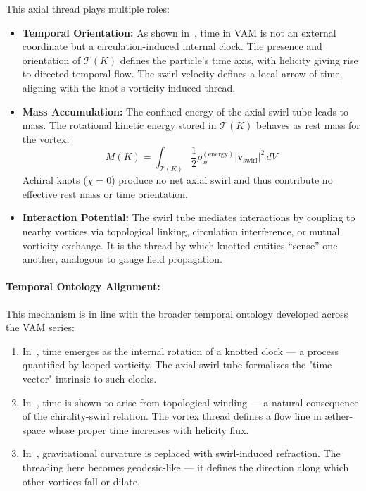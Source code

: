 \documentclass[a4paper,12pt]{article}
\begin{document}
This axial thread plays multiple roles:
\begin{itemize}
    \item \textbf{Temporal Orientation:} As shown in~\cite{VAM2}, time in VAM is not an external coordinate but a circulation-induced internal clock. The presence and orientation of $\mathcal{T}(K)$ defines the particle’s time axis, with helicity giving rise to directed temporal flow. The swirl velocity defines a local arrow of time, aligning with the knot’s vorticity-induced thread.

    \item \textbf{Mass Accumulation:} The confined energy of the axial swirl tube leads to mass. The rotational kinetic energy stored in $\mathcal{T}(K)$ behaves as rest mass for the vortex:
    \begin{equation}
        M(K) = \int_{\mathcal{T}(K)} \frac{1}{2} \rho_{\text{\ae}}^{(\text{energy})} |\mathbf{v}_{\text{swirl}}|^2 \, dV
    \end{equation}
    Achiral knots ($\chi = 0$) produce no net axial swirl and thus contribute no effective rest mass or time orientation.

    \item \textbf{Interaction Potential:} The swirl tube mediates interactions by coupling to nearby vortices via topological linking, circulation interference, or mutual vorticity exchange. It is the thread by which knotted entities “sense” one another, analogous to gauge field propagation.
\end{itemize}

\paragraph{Temporal Ontology Alignment:}
This mechanism is in line with the broader temporal ontology developed across the VAM series:
\begin{enumerate}
    \item In~\cite{VAM2}, time emerges as the internal rotation of a knotted clock --- a process quantified by looped vorticity. The axial swirl tube formalizes the "time vector" intrinsic to such clocks.

    \item In~\cite{VAM13}, time is shown to arise from topological winding --- a natural consequence of the chirality-swirl relation. The vortex thread defines a flow line in æther-space whose proper time increases with helicity flux.

    \item In~\cite{VAM4}, gravitational curvature is replaced with swirl-induced refraction. The threading here becomes geodesic-like --- it defines the direction along which other vortices fall or dilate.
\end{enumerate}
\end{document}
